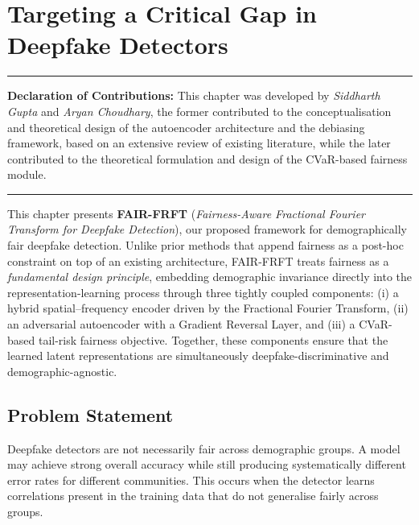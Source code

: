  
\chapter{Targeting a Critical Gap in Deepfake Detectors}
\label{ch:proposed}
 
\vspace{0.5em}
\noindent\rule{\textwidth}{0.4pt}
\textbf{Declaration of Contributions:} This chapter was developed by
\textit{Siddharth Gupta} and \textit{Aryan Choudhary}, the former contributed to the conceptualisation and theoretical design of the autoencoder architecture and the debiasing framework, based on an extensive review of existing literature, while the later contributed to the theoretical formulation and design of the CVaR-based fairness module.
\noindent\rule{\textwidth}{0.4pt}
\vspace{1em}

\bigskip


 
This chapter presents \textbf{FAIR-FRFT} (\emph{Fairness-Aware
Fractional Fourier Transform for Deepfake Detection}), our proposed
framework for demographically fair deepfake detection.  Unlike prior
methods that append fairness as a post-hoc constraint on top of an
existing architecture, FAIR-FRFT treats fairness as a
\emph{fundamental design principle}, embedding demographic invariance
directly into the representation-learning process through three
tightly coupled components: (i) a hybrid spatial--frequency encoder
driven by the Fractional Fourier Transform, (ii) an adversarial
autoencoder with a Gradient Reversal Layer, and (iii) a
CVaR-based tail-risk fairness objective.  Together, these components
ensure that the learned latent representations are simultaneously
deepfake-discriminative and demographic-agnostic.

\section{Problem Statement}
\label{sec:problem_statement}

Deepfake detectors are not necessarily fair across demographic groups.
A model may achieve strong overall accuracy while still producing
systematically different error rates for different communities. This occurs when the detector learns correlations present in the training data that do not generalise fairly across groups.


